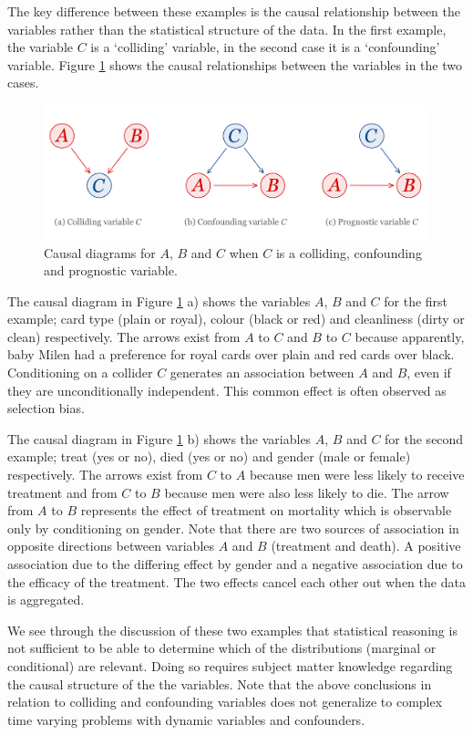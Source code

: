 The key difference between these examples is the causal relationship between the variables rather than the statistical structure of the data. In the first example, the variable $C$ is a `colliding' variable, in the second case it is a `confounding' variable. Figure \ref{fig_CollConfProg} shows the causal relationships between the variables in the two cases.
%
\begin{figure}[h!]
\includegraphics[width=\textwidth]{01_MotivationAndContext/figures/Fig_CollConfProg.jpg}
\caption{Causal diagrams for $A$, $B$ and $C$ when $C$ is a colliding, confounding and prognostic variable.}
\label{fig_CollConfProg}
\end{figure}
%
The causal diagram in Figure \ref{fig_CollConfProg} a) shows the variables $A$, $B$ and $C$ for the first example; card type (plain or royal), colour (black or red)  and cleanliness (dirty or clean) respectively. The arrows exist from $A$ to $C$ and $B$ to $C$ because apparently, baby Milen had a preference for royal cards over plain and red cards over black. Conditioning on a collider $C$ generates an association between $A$ and $B$, even if they are unconditionally independent. This common effect is often observed as selection bias.

The causal diagram in Figure \ref{fig_CollConfProg} b) shows the variables $A$, $B$ and $C$ for the second example; treat (yes or no), died (yes or no) and gender (male or female) respectively. The arrows exist from $C$ to $A$ because men were less likely to receive treatment and from $C$ to $B$ because men were also less likely to die. The arrow from $A$ to $B$ represents the effect of treatment on mortality which is observable only by conditioning on gender. Note that there are two sources of association in opposite directions between variables $A$ and $B$ (treatment and death). A positive association due to the differing effect by gender and a negative association due to the efficacy of the treatment. The two effects cancel each other out when the data is aggregated.

We see through the discussion of these two examples that statistical reasoning is not sufficient to be able to determine which of the distributions (marginal or conditional) are relevant. Doing so requires subject matter knowledge regarding the causal structure of the the variables. Note that the above conclusions in relation to colliding and confounding variables does not generalize to complex time varying problems with dynamic variables and confounders.

